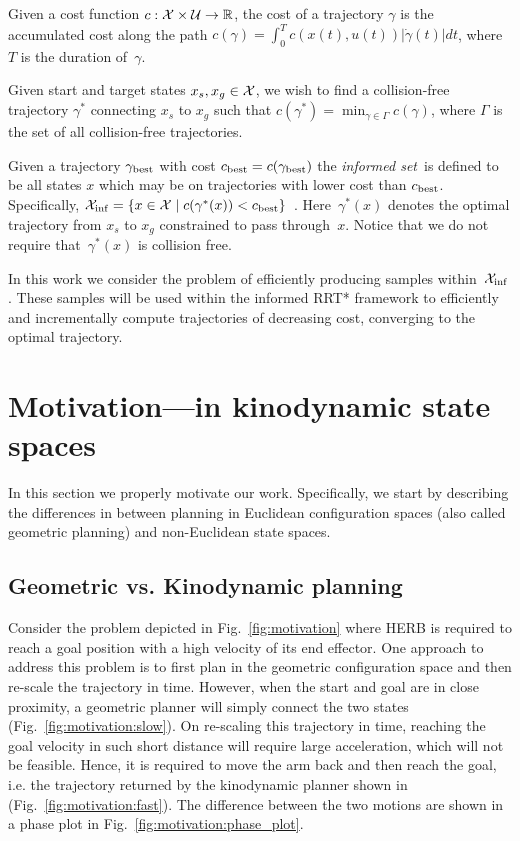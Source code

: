 \documentclass[letterpaper, 10 pt, conference]{ieeeconf}  %
\begin{document}
Given a cost function $c : \mathcal{X} \times \mathcal{U} \rightarrow \mathbb{R}$, the cost of a trajectory $ \gamma $ is the accumulated cost along the path
$c(\gamma) = \int_0^{T} c( x(t), u(t) ) |\dot{\gamma}(t)|dt$, 
where $T$ is the duration of~$\gamma$.

Given start and target states $x_s, x_g \in \mathcal{X}$, we wish to find a collision-free trajectory $\gamma^*$ connecting $x_s$ to $x_g$ such that 
$c(\gamma^*) = \min_{\gamma \in \Gamma} c(\gamma)$, where $\Gamma$ is the set of all collision-free trajectories.

Given a trajectory $\gamma_{\rm best}$ with cost $c_{\rm best} = c(\gamma_{\rm best})$ the \emph{informed set}~\Cinf is defined to be all states $x$  which may be on trajectories with lower cost than $c_{\rm best}$.
Specifically,
$
\mathcal{X}_{\rm {inf}} = \{ x \in \mathcal{X} \mid  
		c ( \gamma^*(x) ) < c_{\rm best} \} $~\cite{GSB14}.
Here~$ \gamma^*(x) $ denotes the optimal trajectory  from $ x_s $ to $ x_g $ constrained to pass through~$x $.
Notice that we do not require that~$ \gamma^*(x) $ is collision free.

In this work we consider the problem of efficiently producing samples within~$\mathcal{X}_{\rm {inf}}$.
These samples will be used within the informed RRT* framework to efficiently and incrementally compute trajectories of decreasing cost, converging to the optimal trajectory.


\section{Motivation---\Cinf in kinodynamic state spaces}
\label{sec:mtdi}

In this section we properly motivate our work.
Specifically, we start by describing the differences in between planning in Euclidean configuration spaces (also called geometric planning) and non-Euclidean  state spaces.


\subsection{Geometric vs. Kinodynamic planning}
Consider the problem depicted in Fig.~\ref{fig:motivation} where HERB is required to reach a goal position with a high  velocity of its end effector.
One approach to address this problem is to first plan in the geometric configuration space and then re-scale the trajectory in time.
However, when the start and goal are in close proximity, a geometric planner will simply connect the two states (Fig.~\ref{fig:motivation:slow}).
On re-scaling this trajectory in time, reaching the goal velocity in such short distance will require large acceleration, which will not be feasible.
Hence, it is required to move the arm back and then reach the goal, i.e. the trajectory returned by the kinodynamic planner shown in (Fig.~\ref{fig:motivation:fast}).
The difference between the two motions are shown in a phase plot in Fig.~\ref{fig:motivation:phase_plot}.
\end{document}
